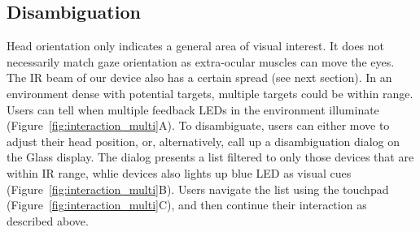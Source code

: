 \subsection{Disambiguation}
Head orientation only indicates a general area of visual interest. It does not necessarily match gaze orientation as extra-ocular muscles can move the eyes. The IR beam of our device also has a certain spread (see next section). In an environment dense with potential targets, multiple targets could be within range. Users can tell when multiple feedback LEDs in the environment illuminate (Figure~\ref{fig:interaction_multi}A). To disambiguate, users can either move to adjust their head position, or, alternatively, call up a disambiguation dialog on the Glass display. The dialog presents a list filtered to only those devices that are within IR range, whlie devices also lights up blue LED as visual cues (Figure~\ref{fig:interaction_multi}B). Users navigate the list using the touchpad (Figure~\ref{fig:interaction_multi}C), and then continue their interaction as described above.
